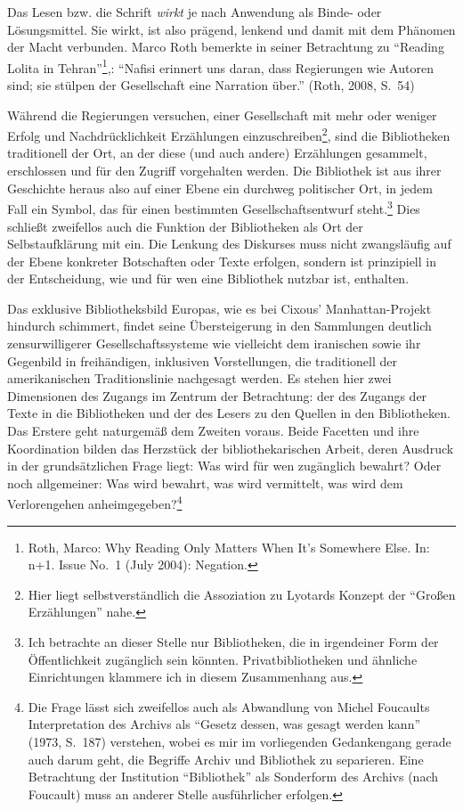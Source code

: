 \documentclass[output=paper]{langscibook}
\begin{document}
Das Lesen bzw. die Schrift \emph{wirkt} je nach Anwendung als Binde-
oder Lösungsmittel. Sie wirkt, ist also prägend, lenkend und damit mit
dem Phänomen der Macht verbunden. Marco Roth bemerkte in seiner
Betrachtung zu \enquote{Reading Lolita in Tehran}\footnote{Roth, Marco:
  Why Reading Only Matters When It's Somewhere Else. In: n+1. Issue
  No.~1 (July 2004): Negation.},: \enquote{Nafisi erinnert uns daran,
dass Regierungen wie Autoren sind; sie stülpen der Gesellschaft eine
Narration über.} (Roth, 2008, S.~54)

Während die Regierungen versuchen, einer Gesellschaft mit mehr oder
weniger Erfolg und Nachdrücklichkeit Erzählungen
einzuschreiben\footnote{Hier liegt selbstverständlich die Assoziation zu
  Lyotards Konzept der \enquote{Großen Erzählungen} nahe.}, sind die
Bibliotheken traditionell der Ort, an der diese (und auch andere)
Erzählungen gesammelt, erschlossen und für den Zugriff vorgehalten
werden. Die Bibliothek ist aus ihrer Geschichte heraus also auf einer
Ebene ein durchweg politischer Ort, in jedem Fall ein Symbol, das für
einen bestimmten Gesellschaftsentwurf steht.\footnote{Ich betrachte an
  dieser Stelle nur Bibliotheken, die in irgendeiner Form der
  Öffentlichkeit zugänglich sein könnten. Privatbibliotheken und
  ähnliche Einrichtungen klammere ich in diesem Zusammenhang aus.} Dies
schließt zweifellos auch die Funktion der Bibliotheken als Ort der
Selbstaufklärung mit ein. Die Lenkung des Diskurses muss nicht
zwangsläufig auf der Ebene konkreter Botschaften oder Texte erfolgen,
sondern ist prinzipiell in der Entscheidung, wie und für wen eine
Bibliothek nutzbar ist, enthalten.

Das exklusive Bibliotheksbild Europas, wie es bei Cixous'
Manhattan-Projekt hindurch schimmert, findet seine Übersteigerung in den
Sammlungen deutlich zensurwilligerer Gesellschaftssysteme wie vielleicht
dem iranischen sowie ihr Gegenbild in freihändigen, inklusiven
Vorstellungen, die traditionell der amerikanischen Traditionslinie
nachgesagt werden. Es stehen hier zwei Dimensionen des Zugangs im
Zentrum der Betrachtung: der des Zugangs der Texte in die Bibliotheken
und der des Lesers zu den Quellen in den Bibliotheken. Das Erstere geht
naturgemäß dem Zweiten voraus. Beide Facetten und ihre Koordination
bilden das Herzstück der bibliothekarischen Arbeit, deren Ausdruck in
der grundsätzlichen Frage liegt: Was wird für wen zugänglich bewahrt?
Oder noch allgemeiner: Was wird bewahrt, was wird vermittelt, was wird
dem Verlorengehen anheimgegeben?\footnote{Die Frage lässt sich
  zweifellos auch als Abwandlung von Michel Foucaults Interpretation des
  Archivs als \enquote{Gesetz dessen, was gesagt werden kann} (1973, S.~187) verstehen, wobei es mir im vorliegenden Gedankengang gerade auch
  darum geht, die Begriffe Archiv und Bibliothek zu separieren. Eine
  Betrachtung der Institution \enquote{Bibliothek} als Sonderform des
  Archivs (nach Foucault) muss an anderer Stelle ausführlicher erfolgen.}
\end{document}
